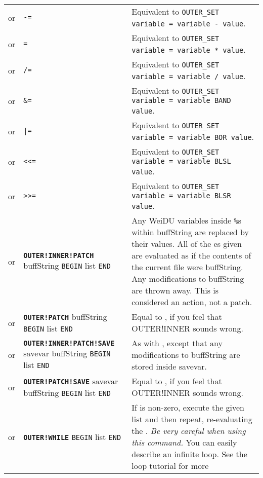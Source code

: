 \documentclass{article}
\def\ttref#1{\ahrefloc{#1}{\tt #1}}
\def\DEFINE#1{{\tt \bf #1}\label{#1}\index{#1}}
\def\t#1{{\tt #1}}
\def\Slist{{\color{red} list }}
\begin{document}
\begin{tabular}{cp{10in}|p{10in}}
or & \ttref{OUTER!SET} \ttref{variable} \t{-=} \ttref{value} &
  Equivalent to \t{OUTER_SET variable = variable - value}. \\
or & \ttref{OUTER!SET} \ttref{variable} \t{*=} \ttref{value} &
  Equivalent to \t{OUTER_SET variable = variable * value}. \\
or & \ttref{OUTER!SET} \ttref{variable} \t{/=} \ttref{value} &
  Equivalent to \t{OUTER_SET variable = variable / value}. \\
or & \ttref{OUTER!SET} \ttref{variable} \t{\&=} \ttref{value} &
  Equivalent to \t{OUTER_SET variable = variable BAND value}. \\
or & \ttref{OUTER!SET} \ttref{variable} \t{|=} \ttref{value} &
  Equivalent to \t{OUTER_SET variable = variable BOR value}. \\
or & \ttref{OUTER!SET} \ttref{variable} \t{<<=} \ttref{value} &
  Equivalent to \t{OUTER_SET variable = variable BLSL value}. \\
or & \ttref{OUTER!SET} \ttref{variable} \t{>>=} \ttref{value} &
  Equivalent to \t{OUTER_SET variable = variable BLSR value}. \\
or & \DEFINE{OUTER!INNER!PATCH} buffString \t{BEGIN} \ttref{patch} \Slist \t{END} &
  Any WeiDU variables inside \t{\%}s within buffString are replaced by
  their values. All of the \ttref{patch}es given are evaluated as if the
  contents of the current file were buffString. Any modifications to
  buffString are thrown away. This is considered an action, not a patch. \\
or & \DEFINE{OUTER!PATCH} buffString \t{BEGIN} \ttref{patch} \Slist \t{END} &
  Equal to \ttref{OUTER!INNER!PATCH}, if you feel that OUTER!INNER sounds wrong. \\
or & \DEFINE{OUTER!INNER!PATCH!SAVE} savevar buffString \t{BEGIN} \ttref{patch} \Slist \t{END} &
  As with \ttref{OUTER!INNER!PATCH}, except that any modifications to buffString are stored inside
  savevar. \\
or & \DEFINE{OUTER!PATCH!SAVE} savevar buffString \t{BEGIN} \ttref{patch} \Slist \t{END} &
  Equal to \ttref{OUTER!INNER!PATCH!SAVE}, if you feel that OUTER!INNER sounds wrong. \\
or & \DEFINE{OUTER!WHILE} \ttref{value} \t{BEGIN} 
  \ttref{TP2 Action} \Slist \t{END} & 
  If \ttref{value} is non-zero, execute the given \ttref{TP2 Action} \Slist and
  then repeat, re-evaluating the \ttref{value}. 
  {\em Be very careful when using this command. } You can easily describe
  an infinite loop. See the \ttref{WHILE} loop tutorial for more

\end{tabular}
\end{document}
